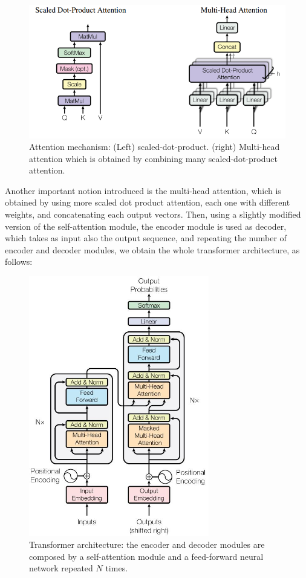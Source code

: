 \begin{figure}[H]
    \centering
    \includegraphics[width=\textwidth]{./images/2_attention}
    \caption[Attention mechanisms]{Attention mechanism: (Left) scaled-dot-product. (right) Multi-head attention which is obtained by combining many scaled-dot-product attention.}
    \label{fig:figure-encoder-structure}
\end{figure}

Another important notion introduced is the multi-head attention, which is obtained by using more scaled dot product attention, each one with different weights, and concatenating each output vectors.
Then, using a slightly modified version of the self-attention module, the encoder module is used as decoder, which takes as input also the output sequence, and repeating the number of encoder and decoder modules, we obtain the whole transformer architecture, as follows:

\begin{figure}[H]
    \centering
    \includegraphics[width=0.7\textwidth]{./images/2_transformer}
    \caption{Transformer architecture: the encoder and decoder modules are composed by a self-attention module and a feed-forward neural network repeated $N$ times.}
    \label{fig:figure-transformer-architecture}
\end{figure}

